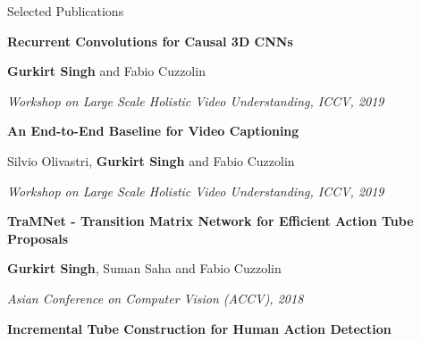 \documentclass{resume} %
\begin{document}
\begin{rSection}{Selected Publications}


\vspace{-0.03in}
\textbf{Recurrent Convolutions for Causal 3D CNNs}

\vspace{-0.08in}
\small{\textbf{Gurkirt Singh} and Fabio Cuzzolin}

\vspace{-0.08in}
\textit{\small{Workshop on Large Scale Holistic Video Understanding, ICCV, 2019}}


\vspace{-0.03in}
\textbf{An End-to-End Baseline for Video Captioning}

\vspace{-0.08in}
\small{Silvio Olivastri, \textbf{Gurkirt Singh} and Fabio Cuzzolin}

\vspace{-0.08in}
\textit{\small{Workshop on Large Scale Holistic Video Understanding, ICCV, 2019}}


\vspace{-0.03in}
\textbf{TraMNet - Transition Matrix Network for Efficient Action Tube Proposals}

\vspace{-0.08in}
\small{\textbf{Gurkirt Singh}, Suman Saha and Fabio Cuzzolin}

\vspace{-0.08in}
\textit{\small{Asian Conference on Computer Vision (ACCV), 2018}}


\vspace{0.03in}
\textbf{Incremental Tube Construction for Human Action Detection}


\end{rSection}
\end{document}
